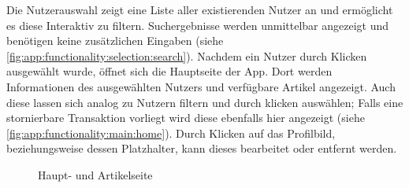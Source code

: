 Die Nutzerauswahl zeigt eine Liste aller existierenden Nutzer an und ermöglicht es diese Interaktiv zu filtern.
Suchergebnisse werden unmittelbar angezeigt und benötigen keine zusätzlichen Eingaben (siehe \autoref{fig:app:functionality:selection:search}).
Nachdem ein Nutzer durch Klicken ausgewählt wurde, öffnet sich die Hauptseite der App.
Dort werden Informationen des ausgewählten Nutzers und verfügbare Artikel angezeigt.
Auch diese lassen sich analog zu Nutzern filtern und durch klicken auswählen;
Falls eine stornierbare Transaktion vorliegt wird diese ebenfalls hier angezeigt (siehe \autoref{fig:app:functionality:main:home}).
Durch Klicken auf das Profilbild, beziehungsweise dessen Platzhalter, kann dieses bearbeitet oder entfernt werden.
\begin{figure}[!htbp]%
	\centering%
	\qquad%
	\caption{Haupt- und Artikelseite}%
	\label{fig:app:functionality:home}%
\end{figure}

